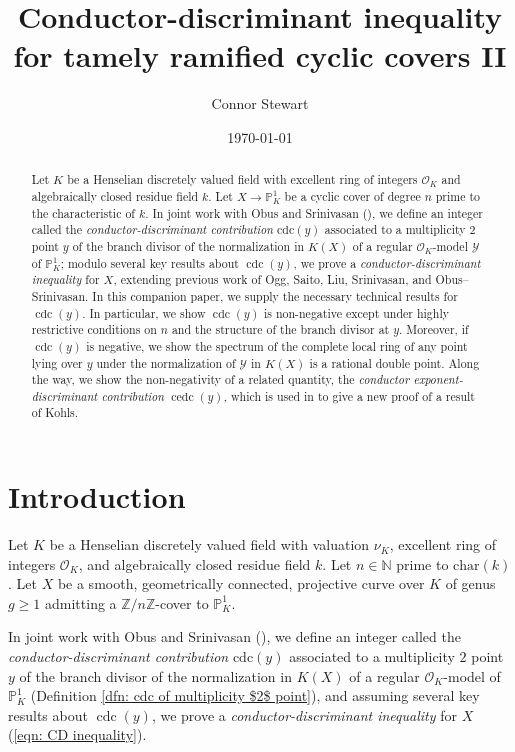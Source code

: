 \documentclass[12pt]{amsart}
\title[Conductor-discriminant inequality]{Conductor-discriminant
  inequality for tamely ramified cyclic covers II}
\author{Connor Stewart}
\date{\today}
\numberwithin{equation}{section}
\theoremstyle{definition}
\newcommand{\Z}{\mathbb Z}
\newcommand{\N}{\mathbb N}
\renewcommand{\O}{\mathcal{O}}
\renewcommand{\P}{\mathbb P}
\newcommand{\Y}{\mathcal{Y}}
\newcommand{\tx}[1]{\text{#1}}
\DeclareMathOperator{\cdc}{cdc}
\DeclareMathOperator{\cedc}{cedc}
\begin{document}
\begin{abstract}
Let $K$ be a Henselian discretely valued field with excellent ring of integers $\O_K$ and algebraically closed residue field $k$. Let $X\to\P^1_K$ be a cyclic cover of degree $n$ prime to the characteristic of $k$. In joint work with Obus and Srinivasan (\cite{Part1}), we define an integer called the \textit{conductor-discriminant contribution} $\tx{cdc}(y)$ associated to a multiplicity $2$ point $y$ of the branch divisor of the normalization in $K(X)$ of a regular $\O_K$-model $\Y$ of $\P^1_{K}$; modulo several key results about $\cdc(y)$, we prove a \textit{conductor-discriminant inequality} for $X$, extending previous work of Ogg, Saito, Liu, Srinivasan, and Obus--Srinivasan. In this companion paper, we supply the necessary technical results for $\cdc(y)$. In particular, we show $\cdc(y)$ is non-negative except under highly restrictive conditions on $n$ and the structure of the branch divisor at $y$. Moreover, if $\cdc(y)$ is negative, we show the spectrum of the complete local ring of any point lying over $y$ under the normalization of $\Y$ in $K(X)$ is a rational double point. Along the way, we show the non-negativity of a related quantity, the \textit{conductor exponent-discriminant contribution} $\cedc(y)$, which is used in \cite{Part1} to give a new proof of a result of Kohls.
\end{abstract}

\maketitle

\tableofcontents


\section{Introduction}

Let $K$ be a Henselian discretely valued field with valuation $\nu_K$, excellent ring of integers $\O_K$, and algebraically closed residue field $k$. Let $n\in\N$ prime to $\tx{char}(k)$. Let $X$ be a smooth, geometrically connected, projective curve over $K$ of genus $g\geq1$ admitting a $\Z/n\Z$-cover to $\P^1_K$.

In joint work with Obus and Srinivasan (\cite{Part1}), we define an integer called the \textit{conductor-discriminant contribution} $\tx{cdc}(y)$ associated to a multiplicity $2$ point $y$ of the branch divisor of the normalization in $K(X)$ of a regular $\O_K$-model of $\P^1_{K}$ (Definition \ref{dfn: cdc of multiplicity $2$ point}), and assuming several key results about $\cdc(y)$, we prove a \textit{conductor-discriminant inequality} for $X$ (\eqref{eqn: CD inequality}).
\end{document}
